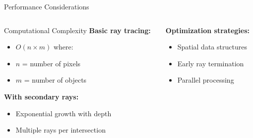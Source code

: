 \begin{frame}{Performance Considerations}
    \begin{columns}
        \begin{column}{0.5\textwidth}
            \begin{raybox}{Computational Complexity}
                \textbf{Basic ray tracing:}
                \begin{itemize}
                    \item $O(n \times m)$ where:
                    \item $n$ = number of pixels
                    \item $m$ = number of objects
                \end{itemize}

                \vspace{0.3cm}
                \textbf{With secondary rays:}
                \begin{itemize}
                    \item Exponential growth with depth
                    \item Multiple rays per intersection
                \end{itemize}
            \end{raybox}
        \end{column}
        \begin{column}{0.5\textwidth}

            \vspace{0.3cm}
            \textbf{Optimization strategies:}
            \begin{itemize}
                \item Spatial data structures
                \item Early ray termination
                \item Parallel processing
            \end{itemize}
        \end{column}
    \end{columns}
\end{frame}

